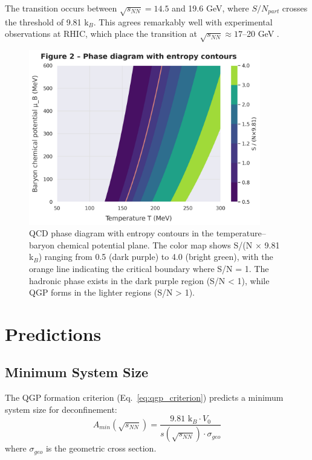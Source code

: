 \documentclass[12pt,a4paper]{article}
\begin{document}
The transition occurs between $\sqrt{s_{NN}} = 14.5$ and 19.6 GeV, where $S/N_{part}$ crosses the threshold of 9.81 k$_B$. This agrees remarkably well with experimental observations at RHIC, which place the transition at $\sqrt{s_{NN}} \approx 17$--20 GeV \cite{STAR2017,STAR2020}.

\begin{figure}[H]
\centering
\includegraphics[width=0.9\textwidth]{figures/figure2_phase_diagram.png}
\caption{QCD phase diagram with entropy contours in the temperature--baryon chemical potential plane. The color map shows S/(N × 9.81 k$_B$) ranging from 0.5 (dark purple) to 4.0 (bright green), with the orange line indicating the critical boundary where S/N = 1. The hadronic phase exists in the dark purple region (S/N < 1), while QGP forms in the lighter regions (S/N > 1).}
\label{fig:phase_diagram}
\end{figure}

\section{Predictions}

\subsection{Minimum System Size}

The QGP formation criterion (Eq.~\ref{eq:qgp_criterion}) predicts a minimum system size for deconfinement:
\begin{equation}
A_{min}(\sqrt{s_{NN}}) = \frac{9.81 \text{ k}_B \cdot V_0}{s(\sqrt{s_{NN}}) \cdot \sigma_{geo}}
\label{eq:min_size}
\end{equation}
where $\sigma_{geo}$ is the geometric cross section.
\end{document}
